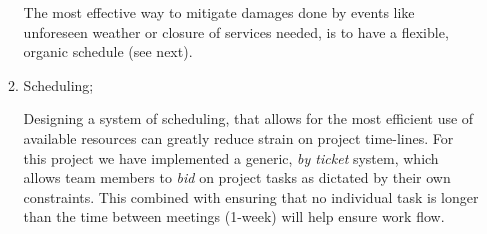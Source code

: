 \begin{enumerate}
\begin{enumerate}
  The most effective way to mitigate damages done by events like unforeseen weather or closure of services needed, is to have a flexible, organic schedule (see next).
  \item Scheduling;
  
  Designing a system of scheduling, that allows for the most efficient use of available resources can greatly reduce strain on project time-lines. For this project we have implemented a generic, \textit{by ticket} system, which allows team members to \textit{bid} on project tasks as dictated by their own constraints. This combined with ensuring that no individual task is longer than the time between meetings (1-week) will help ensure work flow. 
  \end{enumerate}
  \end{enumerate}
 
